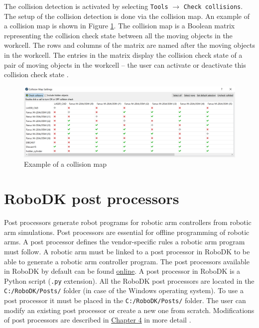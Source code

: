 The collision detection is activated by selecting \texttt{Tools} $\rightarrow$ \texttt{Check collisions}. The setup of the collision detection is done via the collision map. An example of a collision map is shown in Figure \ref{fig:collisionmap}. The collision map is a Boolean matrix representing the collision check state between all the moving objects in the workcell. The rows and columns of the matrix are named after the moving objects in the workcell. The entries in the matrix display the collision check state of a pair of moving objects in the workcell -- the user can activate or deactivate this collision check state \cite{robodkcollision}.

\begin{figure}[h]
    \centering
    \includegraphics[width=1.0\linewidth]{img/collision_map.PNG}
    \caption{Example of a collision map}
    \label{fig:collisionmap}
\end{figure}

\section{RoboDK post processors}

Post processors generate robot programs for robotic arm controllers from robotic arm simulations. Post processors are essential for offline programming of robotic arms. A post processor defines the vendor-specific rules a robotic arm program must follow. A robotic arm must be linked to a post processor in RoboDK to be able to generate a robotic arm controller program. The post processors available in RoboDK by default can be found \href{https://robodk.com/doc/en/Post-Processors.html#AvailablePosts}{online}.  
A post processor in RoboDK is a Python script (\texttt{.py} extension). All the RoboDK post processors are located in the
\texttt{C:/RoboDK/Posts/} folder (in case of the Windows operating system).  To use a post processor it must be placed in the \texttt{C:/RoboDK/Posts/} folder. The user can modify an existing post processor or create a new one from scratch. Modifications of post processors are described in \hyperref[chap:implementation]{Chapter 4} in more detail \cite{robodkposts}. 